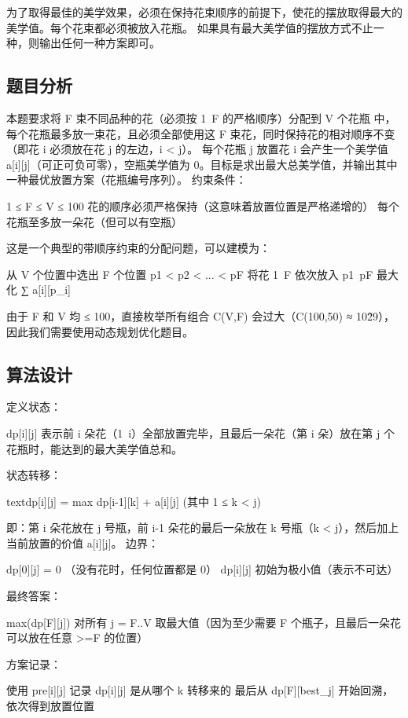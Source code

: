 \documentclass[supercite]{Experimental_Report}
\theoremstyle{definition}
\begin{document}
	为了取得最佳的美学效果，必须在保持花束顺序的前提下，使花的摆放取得最大的美学值。每个花束都必须被放入花瓶。 如果具有最大美学值的摆放方式不止一种，则输出任何一种方案即可。
	\subsection{题目分析}
	本题要求将 F 束不同品种的花（必须按 1~F 的严格顺序）分配到 V 个花瓶 中，每个花瓶最多放一束花，且必须全部使用这 F 束花，同时保持花的相对顺序不变（即花 i 必须放在花 j 的左边，i < j）。
	每个花瓶 j 放置花 i 会产生一个美学值 a[i][j]（可正可负可零），空瓶美学值为 0。目标是求出最大总美学值，并输出其中一种最优放置方案（花瓶编号序列）。
	约束条件：
	
	1 ≤ F ≤ V ≤ 100
	花的顺序必须严格保持（这意味着放置位置是严格递增的）
	每个花瓶至多放一朵花（但可以有空瓶）
	
	这是一个典型的带顺序约束的分配问题，可以建模为：
	
	从 V 个位置中选出 F 个位置 p1 < p2 < ... < pF
	将花 1~F 依次放入 p1~pF
	最大化 ∑ a[i][p\_i]
	
	由于 F 和 V 均 ≤ 100，直接枚举所有组合 C(V,F) 会过大（C(100,50) ≈ 10\^29），因此我们需要使用动态规划优化题目。
	\subsection{算法设计}
	定义状态：
	
	dp[i][j] 表示前 i 朵花（1~i）全部放置完毕，且最后一朵花（第 i 朵）放在第 j 个花瓶时，能达到的最大美学值总和。
	
	状态转移：
	
	
	textdp[i][j] = max{ dp[i-1][k] + a[i][j] }    (其中 1 ≤ k < j)
	
	即：第 i 朵花放在 j 号瓶，前 i-1 朵花的最后一朵放在 k 号瓶（k < j），然后加上当前放置的价值 a[i][j]。
	边界：
	
	dp[0][j] = 0  （没有花时，任何位置都是 0）
	dp[i][j] 初始为极小值（表示不可达）
	
	最终答案：
	
	max(dp[F][j])  对所有 j = F..V 取最大值（因为至少需要 F 个瓶子，且最后一朵花可以放在任意 >=F 的位置）
	
	方案记录：
	
	使用 pre[i][j] 记录 dp[i][j] 是从哪个 k 转移来的
	最后从 dp[F][best\_j] 开始回溯，依次得到放置位置
	
\end{document}

